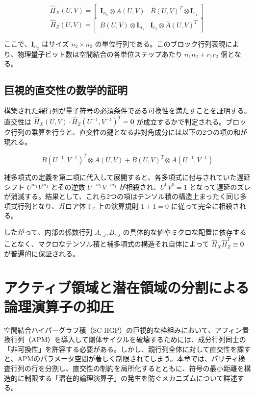 \documentclass[12pt]{article}
\begin{document}
\begin{equation}
    \hat{H}_X(U,V) = \begin{bmatrix} \mathbf{I}_{n_2} \otimes A(U,V) & \bar{B}(U,V)^T \otimes \mathbf{I}_{r_1} \end{bmatrix}
\end{equation}
\begin{equation}
    \hat{H}_Z(U,V) = \begin{bmatrix} B(U,V) \otimes \mathbf{I}_{n_1} & \mathbf{I}_{r_2} \otimes \bar{A}(U,V)^T \end{bmatrix}
\end{equation}

ここで、$\mathbf{I}_{n_2}$ はサイズ $n_2 \times n_2$ の単位行列である。このブロック行列表現により、物理量子ビット数は空間結合の各単位ステップあたり $n_1 n_2 + r_1 r_2$ 個となる。

\subsection{巨視的直交性の数学的証明}
構築された親行列が量子符号の必須条件である可換性を満たすことを証明する。直交性は $\hat{H}_X(U,V) \cdot \hat{H}_Z(U^{-1}, V^{-1})^T = \mathbf{0}$ が成立するかで判定される。ブロック行列の乗算を行うと、直交性の鍵となる非対角成分には以下の2つの項の和が現れる。

\begin{equation}
    B(U^{-1}, V^{-1})^T \otimes A(U,V) + \bar{B}(U,V)^T \otimes \bar{A}(U^{-1}, V^{-1})
\end{equation}

補多項式の定義を第二項に代入して展開すると、各多項式に付与されていた遅延シフト $U^{m_1}V^{m_2}$ とその逆数 $U^{-m_1}V^{-m_2}$ が相殺され、$U^0 V^0 = 1$ となって遅延のズレが消滅する。結果として、これら2つの項はテンソル積の構造上まったく同じ多項式行列となり、ガロア体 $\mathbb{F}_2$ 上の演算規則 $1+1=0$ に従って完全に相殺される。

したがって、内部の係数行列 $A_{i,j}, B_{i,j}$ の具体的な値やミクロな配置に依存することなく、マクロなテンソル積と補多項式の構造それ自体によって $\hat{H}_X \hat{H}_Z^T \equiv \mathbf{0}$ が普遍的に保証される。

\section{アクティブ領域と潜在領域の分割による論理演算子の抑圧}

空間結合ハイパーグラフ積（SC-HGP）の巨視的な枠組みにおいて、アフィン置換行列（APM）を導入して剛体サイクルを破壊するためには、成分行列同士の「非可換性」を許容する必要がある。しかし、親行列全体に対して直交性を課すと、APMのパラメータ空間が著しく制限されてしまう。本章では、パリティ検査行列の行を分割し、直交性の制約を局所化するとともに、符号の最小距離を構造的に制限する「潜在的論理演算子」の発生を防ぐメカニズムについて詳述する。
\end{document}
